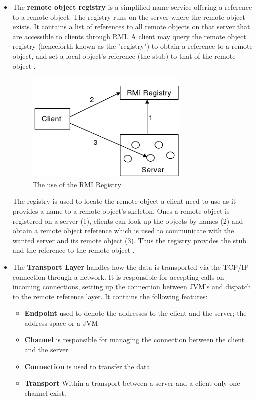 \documentclass[Main]{subfiles}
\begin{document}
\begin{itemize}
\item The \textbf{remote object registry} is a simplified name service offering a reference to a remote object. The registry runs on the server where the remote object exists. It contains a list of references to all remote objects on that server that are accessible to clients through RMI. A client may query the remote object registry (henceforth known as the "registry") to obtain a reference to a remote object, and set a local object's reference (the stub) to that of the remote object \cite{HowRMI}. 
\begin{figure}[H]
\centering
\includegraphics[scale=0.8]{Figurer/RMI-registry.png}
\caption{The use of the RMI Registry \cite{RMI-slides}}
\end{figure}
The registry is used to locate the remote object a client need to use as it provides a name to a remote object's skeleton. Ones a remote object is registered on a server (1), clients can look up the objects by names (2) and obtain a remote object reference which is used to communicate with the wanted server and its remote object (3). Thus the registry provides the stub and the reference to the remote object \cite{Getting-started}.

\item The \textbf{Transport Layer} handles how the data is transported via the TCP/IP connection through a network. It is responsible for accepting calls on incoming connections, setting up the connection between JVM's and dispatch to the remote reference layer. It contains the following features:
\begin{itemize}
\item \textbf{Endpoint} used to denote the addresses to the client and the server; the address space or a JVM
\item \textbf{Channel} is responsible for managing the connection between the client and the server
\item \textbf{Connection} is used to transfer the data
\item \textbf{Transport} Within a transport between a server and a client only one channel exist.
\end{itemize}

\setlength\parindent{300pt}\cite{RMI-slides}

\end{itemize}
\end{document}
